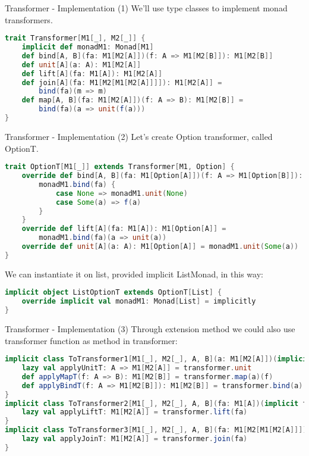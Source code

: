 \begin{frame}[fragile]{Transformer - Implementation (1)}
	We'll use type classes to implement monad transformers.
\begin{lstlisting}[language=scala]
trait Transformer[M1[_], M2[_]] {
	implicit def monadM1: Monad[M1]	
	def bind[A, B](fa: M1[M2[A]])(f: A => M1[M2[B]]): M1[M2[B]]
	def unit[A](a: A): M1[M2[A]]
	def lift[A](fa: M1[A]): M1[M2[A]]
	def join[A](fa: M1[M2[M1[M2[A]]]]): M1[M2[A]] =
		bind(fa)(m => m)
	def map[A, B](fa: M1[M2[A]])(f: A => B): M1[M2[B]] =
		bind(fa)(a => unit(f(a)))
}
\end{lstlisting}
\end{frame}

\begin{frame}[fragile]{Transformer - Implementation (2)}	
	Let's create Option transformer, called OptionT.
\begin{lstlisting}[language=scala]
trait OptionT[M1[_]] extends Transformer[M1, Option] {
	override def bind[A, B](fa: M1[Option[A]])(f: A => M1[Option[B]]): M1[Option[B]] = {
		monadM1.bind(fa) {
			case None => monadM1.unit(None)
			case Some(a) => f(a)
		}
	}
	override def lift[A](fa: M1[A]): M1[Option[A]] =
		monadM1.bind(fa)(a => unit(a))
	override def unit[A](a: A): M1[Option[A]] = monadM1.unit(Some(a))
}		
\end{lstlisting}		
	We can instantiate it on list, provided implicit ListMonad, in  this way:
\begin{lstlisting}[language=scala]
implicit object ListOptionT extends OptionT[List] {
	override implicit val monadM1: Monad[List] = implicitly
}
\end{lstlisting}
\end{frame}

\begin{frame}[fragile]{Transformer - Implementation (3)}	
	Through extension method we could also use transformer function as method in transformer:
\begin{lstlisting}[language=scala]
implicit class ToTransformer1[M1[_], M2[_], A, B](a: M1[M2[A]])(implicit transformer: Transformer[M1, M2]) {
	lazy val applyUnitT: A => M1[M2[A]] = transformer.unit
	def applyMapT(f: A => B): M1[M2[B]] = transformer.map(a)(f)	
	def applyBindT(f: A => M1[M2[B]]): M1[M2[B]] = transformer.bind(a)(f)
}
implicit class ToTransformer2[M1[_], M2[_], A, B](fa: M1[A])(implicit transformer: Transformer[M1, M2]) {
	lazy val applyLiftT: M1[M2[A]] = transformer.lift(fa)
}
implicit class ToTransformer3[M1[_], M2[_], A, B](fa: M1[M2[M1[M2[A]]]])(implicit transformer: Transformer[M1, M2]) {
	lazy val applyJoinT: M1[M2[A]] = transformer.join(fa)
}
\end{lstlisting}	
\end{frame}

